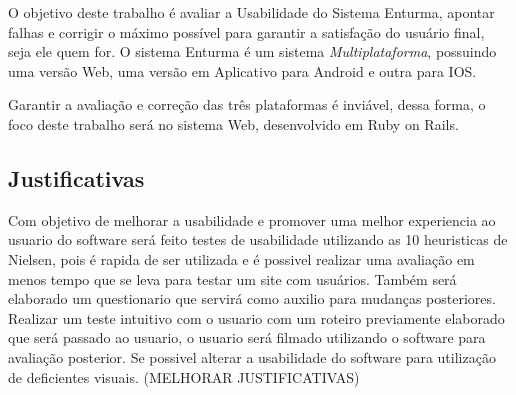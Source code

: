 	O objetivo deste trabalho é avaliar a Usabilidade do Sistema Enturma, apontar falhas e corrigir o máximo possível para garantir a satisfação do usuário final, seja ele quem for. O sistema Enturma é um sistema \textit{Multiplataforma}, possuindo uma versão Web, uma versão em Aplicativo para Android e outra para IOS.

	Garantir a avaliação e correção das três plataformas é inviável, dessa forma, o foco deste trabalho será no sistema Web, desenvolvido em Ruby on Rails.

\subsection{Justificativas}

	
	Com objetivo de melhorar a usabilidade e promover uma melhor experiencia ao usuario do software será feito testes de usabilidade utilizando as 10 heuristicas de Nielsen, pois é rapida de ser utilizada e é possivel realizar uma avaliação em menos tempo que se leva para testar um site com usuários.
	Também será elaborado um questionario que servirá como auxilio para mudanças posteriores.
	Realizar um teste intuitivo com o usuario com um roteiro previamente elaborado que será passado ao usuario,
	o usuario será filmado utilizando o software para avaliação posterior.
	Se possivel alterar a usabilidade do software para utilização de deficientes visuais.
	(MELHORAR JUSTIFICATIVAS)



